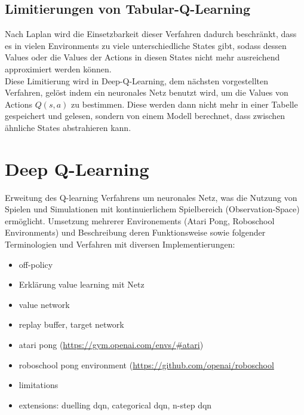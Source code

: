 \documentclass[11pt]{scrartcl}
\begin{document}
\subsection{Limitierungen von Tabular-Q-Learning}
Nach Laplan\cite[~S.192]{L2018} wird die Einsetzbarkeit dieser Verfahren dadurch beschränkt,
dass es in vielen Environments zu viele unterschiedliche States gibt, sodass dessen Values
oder die Values der Actions in diesen States nicht mehr ausreichend approximiert werden
können.\\
Diese Limitierung wird in \grqq Deep-Q-Learning\grqq, dem nächsten vorgestellten
Verfahren, gelöst indem ein neuronales Netz benutzt wird, um die Values von Actions $Q(s,
a)$ zu bestimmen. Diese werden dann nicht mehr in einer Tabelle gespeichert und gelesen,
sondern von einem Modell berechnet, dass zwischen ähnliche States abstrahieren kann.
\newpage


\section{Deep Q-Learning}
Erweitung des Q-learning Verfahrens um neuronales Netz, was die Nutzung von Spielen und
Simulationen mit kontinuierlichem Spielbereich (Observation-Space) ermöglicht. Umsetzung
mehrerer Environements (Atari Pong, Roboschool Environments) und Beschreibung deren
Funktionsweise sowie folgender Terminologien und Verfahren mit diversen Implementierungen:

\begin{itemize}
\itemsep0pt
\item off-policy
\item Erklärung value learning mit Netz
\item value network
\item replay buffer, target network
\item atari pong (\url{https://gym.openai.com/envs/#atari})
\item roboschool pong environment (\url{https://github.com/openai/roboschool}
\item limitations
\item extensions: duelling dqn, categorical dqn, n-step dqn
\end{itemize}
\newpage
\end{document}
